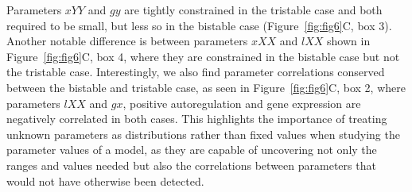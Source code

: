 {%
\clearpage

Parameters $xYY$ and $gy$ are tightly constrained in the tristable case and both required to be small, but less so in the bistable case (Figure~\ref{fig:fig6}C, box 3). Another notable difference is between parameters $xXX$ and $lXX$ shown in Figure~\ref{fig:fig6}C, box 4, where they are constrained in the bistable case but not the tristable case. Interestingly, we also find parameter correlations conserved between the bistable and tristable case, as seen in Figure~\ref{fig:fig6}C, box 2, where parameters $lXX$ and $gx$, positive autoregulation and gene expression are negatively correlated in both cases.  This highlights the importance of treating unknown parameters as distributions rather than fixed values when studying the parameter values of a model, as they are capable of uncovering not only the ranges and values needed but also the correlations between parameters that would not have otherwise been detected.

}

